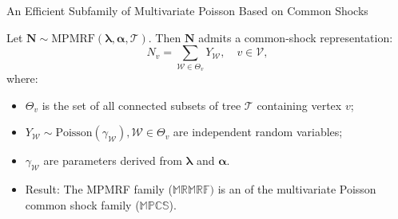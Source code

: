 \documentclass[11pt,xcolor={dvipsnames},hyperref={pdftex,pdfpagemode=UseNone,hidelinks,pdfdisplaydoctitle=true},usepdftitle=false]{beamer}
\begin{document}
\begin{frame}{An Efficient Subfamily of Multivariate Poisson Based on Common Shocks}
\begin{theorem}
Let $\boldsymbol{N} \sim \text{MPMRF}(\boldsymbol{\lambda}, \boldsymbol{\alpha}, \mathcal{T})$. Then $\boldsymbol{N}$ admits a common-shock representation:
    \begin{equation*}
    N_v = \sum_{\mathcal{W} \in \Theta_v} Y_{\mathcal{W}}, \quad v \in \mathcal{V},
    \end{equation*}
    where:
    \begin{itemize}
        \item $\Theta_v$ is the set of all connected subsets of tree $\mathcal{T}$ containing vertex $v$;
        \item $Y_{\mathcal{W}} \sim \text{Poisson}(\gamma_{\mathcal{W}}), \mathcal{W} \in \Theta_v$ are independent random variables;
        \item $\gamma_{\mathcal{W}}$ are parameters derived from $\boldsymbol{\lambda}$ and $\boldsymbol{\alpha}$.
    \end{itemize}
\end{theorem}

\vspace{0.3cm}
\begin{itemize}
    \item Result: The MPMRF family ($\mathbb{MRMRF})$ is an  of the multivariate Poisson common shock family ($\mathbb{MPCS}$). 
\end{itemize}
\end{frame}
\end{document}
